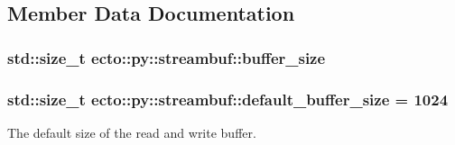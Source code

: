 \subsection{\-Member \-Data \-Documentation}
\hypertarget{classecto_1_1py_1_1streambuf_a8d60fa297a9140474d136a48342ac850}{
\subsubsection[{buffer\-\_\-size}]{\setlength{\rightskip}{0pt plus 5cm}std\-::size\-\_\-t {\bf ecto\-::py\-::streambuf\-::buffer\-\_\-size}}}\label{classecto_1_1py_1_1streambuf_a8d60fa297a9140474d136a48342ac850}
\hypertarget{classecto_1_1py_1_1streambuf_a7a20a01fb9aeda8677b3c65bccd6b59d}{
\subsubsection[{default\-\_\-buffer\-\_\-size}]{\setlength{\rightskip}{0pt plus 5cm}std\-::size\-\_\-t {\bf ecto\-::py\-::streambuf\-::default\-\_\-buffer\-\_\-size} = 1024}}\label{classecto_1_1py_1_1streambuf_a7a20a01fb9aeda8677b3c65bccd6b59d}


\-The default size of the read and write buffer. 

